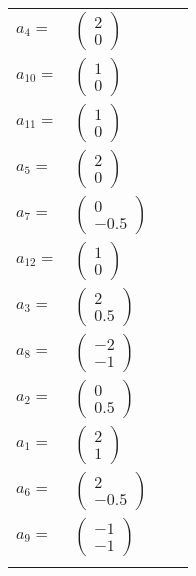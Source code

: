 \documentclass[1p]{elsarticle_modified}
\theoremstyle{definition}
\begin{document}
\begin{tabular}{m{7pt} m{180pt} m{7pt} m{180pt} }
\flushright $a_{4}=$&$\begin{pmatrix}2\\0\end{pmatrix}$ \\
\flushright $a_{10}=$&$\begin{pmatrix}1\\0\end{pmatrix}$ \\
\flushright $a_{11}=$&$\begin{pmatrix}1\\0\end{pmatrix}$ \\
\flushright $a_{5}=$&$\begin{pmatrix}2\\0\end{pmatrix}$ \\
\flushright $a_{7}=$&$\begin{pmatrix}0\\-0.5\end{pmatrix}$ \\
\flushright $a_{12}=$&$\begin{pmatrix}1\\0\end{pmatrix}$ \\
\flushright $a_{3}=$&$\begin{pmatrix}2\\0.5\end{pmatrix}$ \\
\flushright $a_{8}=$&$\begin{pmatrix}-2\\-1\end{pmatrix}$ \\
\flushright $a_{2}=$&$\begin{pmatrix}0\\0.5\end{pmatrix}$ \\
\flushright $a_{1}=$&$\begin{pmatrix}2\\1\end{pmatrix}$ \\
\flushright $a_{6}=$&$\begin{pmatrix}2\\-0.5\end{pmatrix}$ \\
\flushright $a_{9}=$&$\begin{pmatrix}-1\\-1\end{pmatrix}$\\&\end{tabular}
\end{document}
